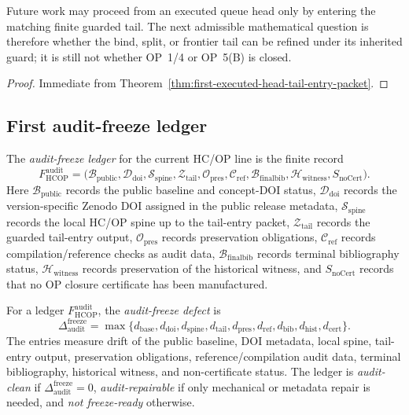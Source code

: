 \begin{corollary}
\label{cor:tail-entry-working-rule}
Future work may proceed from an executed queue head only by entering the matching finite guarded tail.  The next admissible mathematical question is therefore whether the bind, split, or frontier tail can be refined under its inherited guard; it is still not whether OP~1/4 or OP~5(B) is closed.
\end{corollary}

\begin{proof}
Immediate from Theorem~\ref{thm:first-executed-head-tail-entry-packet}.
\end{proof}

\subsection{First audit-freeze ledger}
\label{subsec:first-audit-freeze-ledger}

\begin{definition}
\label{def:first-audit-freeze-ledger}
The \emph{audit-freeze ledger} for the current HC/OP line is the finite record
\[
  F_{\mathrm{HCOP}}^{\mathrm{audit}}
  =
  \bigl(
    \mathcal B_{\mathrm{public}},
    \mathcal D_{\mathrm{doi}},
    \mathcal S_{\mathrm{spine}},
    \mathcal Z_{\mathrm{tail}},
    \mathcal O_{\mathrm{pres}},
    \mathcal C_{\mathrm{ref}},
    \mathcal B_{\mathrm{finalbib}},
    \mathcal H_{\mathrm{witness}},
    S_{\mathrm{noCert}}
  \bigr).
\]
Here \(\mathcal B_{\mathrm{public}}\) records the public baseline and concept-DOI status, \(\mathcal D_{\mathrm{doi}}\) records the version-specific Zenodo DOI assigned in the public release metadata, \(\mathcal S_{\mathrm{spine}}\) records the local HC/OP spine up to the tail-entry packet, \(\mathcal Z_{\mathrm{tail}}\) records the guarded tail-entry output, \(\mathcal O_{\mathrm{pres}}\) records preservation obligations, \(\mathcal C_{\mathrm{ref}}\) records compilation/reference checks as audit data, \(\mathcal B_{\mathrm{finalbib}}\) records terminal bibliography status, \(\mathcal H_{\mathrm{witness}}\) records preservation of the historical witness, and \(S_{\mathrm{noCert}}\) records that no OP closure certificate has been manufactured.
\end{definition}

\begin{definition}
\label{def:audit-freeze-defect}
For a ledger \(F_{\mathrm{HCOP}}^{\mathrm{audit}}\), the \emph{audit-freeze defect} is
\[
  \Delta_{\mathrm{audit}}^{\mathrm{freeze}}
  =
  \max
  \{d_{\mathrm{base}},d_{\mathrm{doi}},d_{\mathrm{spine}},d_{\mathrm{tail}},
    d_{\mathrm{pres}},d_{\mathrm{ref}},d_{\mathrm{bib}},d_{\mathrm{hist}},d_{\mathrm{cert}}\}.
\]
The entries measure drift of the public baseline, DOI metadata, local spine, tail-entry output, preservation obligations, reference/compilation audit data, terminal bibliography, historical witness, and non-certificate status.  The ledger is \emph{audit-clean} if \(\Delta_{\mathrm{audit}}^{\mathrm{freeze}}=0\), \emph{audit-repairable} if only mechanical or metadata repair is needed, and \emph{not freeze-ready} otherwise.
\end{definition}


